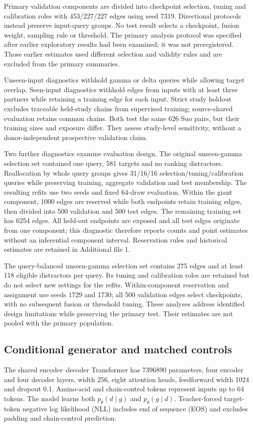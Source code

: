 \documentclass[a4paper,11pt]{article}
\begin{document}
Primary validation components are divided into checkpoint selection, tuning
and calibration roles with 453/227/227 edges using seed 7319. Directional
protocols instead preserve input-query groups. No test result selects a
checkpoint, fusion weight, sampling rule or threshold. The primary analysis
protocol was specified after earlier exploratory results had been examined;
it was not preregistered. Those earlier estimates used different selection
and validity rules and are excluded from the primary summaries.

Unseen-input diagnostics withhold gamma or delta queries while allowing target
overlap. Seen-input diagnostics withhold edges from inputs with at least three
partners while retaining a training edge for each input. Strict study holdout
excludes traceable held-study chains from supervised training; source-shared
evaluation retains common chains. Both test the same 626 Suo pairs, but their
training sizes and exposure differ. They assess study-level sensitivity,
without a donor-independent prospective validation claim.

Two further diagnostics examine evaluation design. The original unseen-gamma
selection set contained one query, 581 targets and no ranking distractors.
Reallocation by whole query groups gives 31/16/16 selection/tuning/calibration
queries while preserving training, aggregate validation and test membership.
The resulting refits use two seeds and fixed 64-draw evaluation.
Within the giant component, 1000 edges are reserved while both endpoints
retain training edges, then divided into 500 validation and 500 test edges.
The remaining training set has 6254 edges. All held-out endpoints are exposed
and all test edges originate from one component; this diagnostic therefore
reports counts and point estimates without an inferential component interval.
Reservation rules and historical estimates are retained in Additional file 1.

The query-balanced unseen-gamma selection set contains 275 edges and at least
118 eligible distractors per query. Its tuning and calibration roles are
retained but do not select new settings for the refits. Within-component
reservation and assignment use seeds 1729 and 1730; all 500 validation edges
select checkpoints, with no subsequent fusion or threshold tuning.
These analyses address identified design limitations while preserving the
primary test. Their estimates are not pooled with the primary population.

\subsection{Conditional generator and matched controls}
The shared encoder--decoder Transformer has 7396890 parameters, four encoder
and four decoder layers, width 256, eight attention heads, feedforward width
1024 and dropout 0.1. Amino-acid and chain-control tokens represent inputs up
to 64 tokens. The model learns both $p_\theta(d\mid g)$ and
$p_\theta(g\mid d)$. Teacher-forced target-token negative log likelihood (NLL)
includes end of sequence (EOS) and excludes padding and chain-control
prediction.
\end{document}
